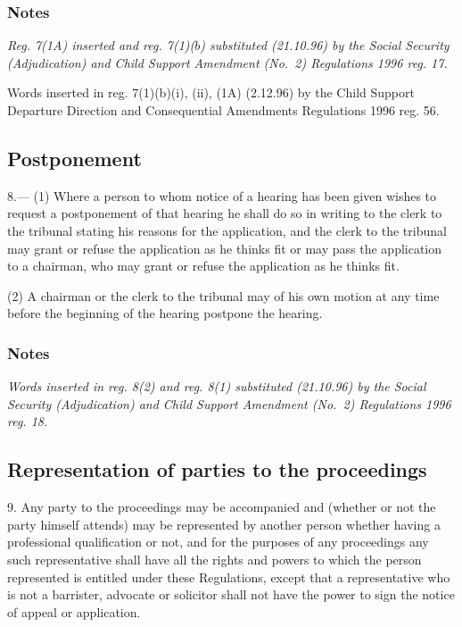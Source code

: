 \documentclass[a4paper]{article}
\newcommand\amendment[1]{\subsubsection*{Notes}{\itshape\frenchspacing\footnotesize #1 \par}}
\begin{document}
\amendment{
Reg. 7(1A) inserted and reg. 7(1)($b$) substituted (21.10.96) by the Social Security (Adjudication) and Child Support Amendment (No.\ 2) Regulations 1996 reg. 17.

Words inserted in reg. 7(1)(b)(i), (ii), (1A) (2.12.96) by the Child Support Departure Direction and Consequential Amendments Regulations 1996 reg. 56.
}

\subsection[8. Postponement]{Postponement}

8.—%
%
(1) Where a person to whom notice of a hearing has been given wishes to request a postponement of that hearing he shall do so in writing to the clerk to the tribunal stating his reasons for the application, and the clerk to the tribunal may grant or refuse the application as he thinks fit or may pass the application to a chairman, who may grant or refuse the application as he thinks fit.

(2) A chairman 
or the clerk to the tribunal  %
may of his own motion at any time before the beginning of the hearing postpone the hearing.

\amendment{
Words inserted in reg. 8(2) and reg. 8(1) substituted (21.10.96) by the Social Security (Adjudication) and Child Support Amendment (No.\ 2) Regulations 1996 reg. 18.
}

\subsection[9. Representation of parties to the proceedings]{Representation of parties to the proceedings}

9.  Any party to the proceedings may be accompanied and (whether or not the party himself attends) may be represented by another person whether having a professional qualification or not, and for the purposes of any proceedings any such representative shall have all the rights and powers to which the person represented is entitled under these Regulations, except that a representative who is not a barrister, advocate or solicitor shall not have the power to sign the notice of appeal or application.
\end{document}
